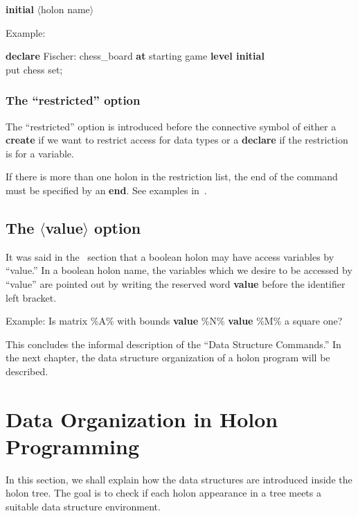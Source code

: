 \documentclass[openany,nobib]{tufte-book}
\newcommand{\kw}[1]{{\bf #1}}
\newcommand{\sym}[1]{$\langle$#1$\rangle$}
\begin{document}
\-\hspace{0.8cm} \kw{initial} \sym{holon name}

\medskip\noindent
Example:

\medskip

\-\hspace{0.8cm} \kw{declare} Fischer: chess\_board \kw{at} starting game
\kw{level initial}\\
\-\hspace{2cm} put chess set;

\subsection{The ``restricted'' option}

The ``restricted'' option is introduced before the connective symbol of either
a \kw{create} if we want to restrict access for data types or a \kw{declare}
if the restriction is for a variable.

If there is more than one holon in the restriction list, the end of the command
must be specified by an \kw{end}. See examples in~.

\section{The \texorpdfstring{\sym{value}}{<value>} option}

\medskip\noindent
It was said in the~ section that a boolean holon may
have access variables by ``value.'' In a boolean holon name, the variables
which we desire to be accessed by ``value'' are pointed out by writing the
reserved word \kw{value} before the identifier left bracket.

Example: Is matrix \%A\% with bounds \kw{value} \%N\% \kw{value} \%M\% a
square one?

This concludes the informal description of the ``Data Structure Commands.'' In
the next chapter, the data structure organization of a holon program will be
described.

\chapter{Data Organization in Holon Programming}

In this section, we shall explain how the data structures are introduced inside
the holon tree. The goal is to check if each holon appearance in a tree meets a
suitable data structure environment.
\end{document}

